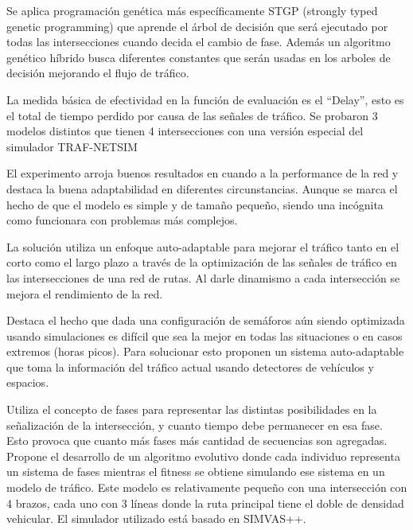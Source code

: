 \begin{itemize}
\begin{item}
Se aplica programación genética más específicamente STGP (strongly typed genetic programming) \citep{Montana1995} que aprende el árbol de decisión que será ejecutado por todas las intersecciones cuando decida el cambio de fase. Además un algoritmo genético híbrido busca diferentes constantes que serán usadas en los arboles de decisión mejorando el flujo de tráfico.

La medida básica de efectividad en la función de evaluación es el “Delay”, esto es el total de tiempo perdido por causa de las señales de tráfico. Se probaron 3 modelos distintos que tienen 4 intersecciones con una versión especial del simulador  TRAF-NETSIM \citep{TRAF-NETSIM}

El experimento arroja buenos resultados en cuando a la performance de la red y destaca la buena adaptabilidad en diferentes circunstancias. Aunque se marca el hecho de que el modelo es simple y de tamaño pequeño, siendo una incógnita como funcionara con problemas más complejos.
	
	\end{item}	


	\begin{item}

La solución utiliza un enfoque auto-adaptable para mejorar el tráfico tanto en el corto como el largo plazo a través de la optimización de las señales de tráfico en las intersecciones de una red de rutas. Al darle dinamismo a cada intersección se mejora el rendimiento de la red.

Destaca el hecho que dada una configuración de semáforos aún siendo optimizada usando simulaciones es difícil que sea la mejor en todas las situaciones o en casos extremos (horas picos). Para solucionar esto proponen un sistema auto-adaptable que toma la información del tráfico actual usando detectores de vehículos y espacios.

Utiliza el concepto de fases para representar las distintas posibilidades en la señalización de la intersección, y cuanto tiempo debe permanecer en esa fase. Esto provoca que cuanto más fases más cantidad de secuencias son agregadas.
Propone el desarrollo de un algoritmo evolutivo donde cada individuo representa un sistema de fases mientras el fitness se obtiene simulando ese sistema en un modelo de tráfico. Este modelo es relativamente pequeño con una intersección con 4 brazos, cada uno con 3 líneas donde la ruta principal tiene el doble de densidad vehicular. El simulador utilizado está basado en SIMVAS++.


\end{item}
\end{itemize}
